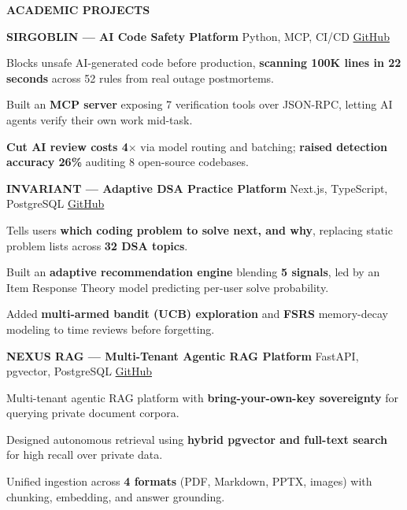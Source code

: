 \documentclass[a4paper,11pt]{article}
\newcommand{\sectionbar}[1]{%
  \vspace{4pt}%
  \noindent\colorbox{barGray}{%
    \parbox{\dimexpr\textwidth-2\fboxsep\relax}{%
      \textbf{\footnotesize\hspace{2pt}\MakeUppercase{\letterspace{#1}}}%
    }%
  }\vspace{3pt}%
}
\newcommand{\letterspace}[1]{#1}
\begin{document}
\sectionbar{Academic Projects}

\textbf{SIRGOBLIN --- AI Code Safety Platform} \textbar{} Python, MCP, CI/CD \textbar{} \href{https://github.com/Pheonix-dev0410/harness}{GitHub}
\begin{tight}
  \item Blocks unsafe AI-generated code before production, \textbf{scanning 100K lines in 22 seconds} across 52 rules from real outage postmortems.
  \item Built an \textbf{MCP server} exposing 7 verification tools over JSON-RPC, letting AI agents verify their own work mid-task.
  \item \textbf{Cut AI review costs 4$\times$} via model routing and batching; \textbf{raised detection accuracy 26\%} auditing 8 open-source codebases.
\end{tight}
\vspace{5pt}

\textbf{INVARIANT --- Adaptive DSA Practice Platform} \textbar{} Next.js, TypeScript, PostgreSQL \textbar{} \href{https://github.com/Pheonix-dev0410/dsa_tracker}{GitHub}
\begin{tight}
  \item Tells users \textbf{which coding problem to solve next, and why}, replacing static problem lists across \textbf{32 DSA topics}.
  \item Built an \textbf{adaptive recommendation engine} blending \textbf{5 signals}, led by an Item Response Theory model predicting per-user solve probability.
  \item Added \textbf{multi-armed bandit (UCB) exploration} and \textbf{FSRS} memory-decay modeling to time reviews before forgetting.
\end{tight}
\vspace{5pt}

\textbf{NEXUS RAG --- Multi-Tenant Agentic RAG Platform} \textbar{} FastAPI, pgvector, PostgreSQL \textbar{} \href{https://github.com/dev-0410/nexus-rag}{GitHub}
\begin{tight}
  \item Multi-tenant agentic RAG platform with \textbf{bring-your-own-key sovereignty} for querying private document corpora.
  \item Designed autonomous retrieval using \textbf{hybrid pgvector and full-text search} for high recall over private data.
  \item Unified ingestion across \textbf{4 formats} (PDF, Markdown, PPTX, images) with chunking, embedding, and answer grounding.
\end{tight}
\end{document}
